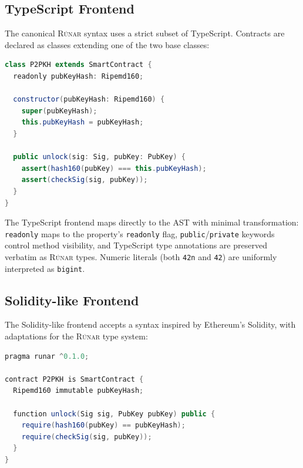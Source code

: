 \documentclass[11pt,a4paper]{article}
\newcommand{\runar}{\textsc{Rúnar}}
\newcommand{\bigintty}{\texttt{bigint}}
\begin{document}
\subsection{TypeScript Frontend}
\label{sec:frontend-ts}

The canonical \runar{} syntax uses a strict subset of TypeScript. Contracts
are declared as classes extending one of the two base classes:

\begin{lstlisting}[style=runar,language=Java,
  morekeywords={class,extends,constructor,super,readonly,public,private,const,let,if,else,for,return,assert,bigint,boolean}]
class P2PKH extends SmartContract {
  readonly pubKeyHash: Ripemd160;

  constructor(pubKeyHash: Ripemd160) {
    super(pubKeyHash);
    this.pubKeyHash = pubKeyHash;
  }

  public unlock(sig: Sig, pubKey: PubKey) {
    assert(hash160(pubKey) === this.pubKeyHash);
    assert(checkSig(sig, pubKey));
  }
}
\end{lstlisting}

The TypeScript frontend maps directly to the AST with minimal transformation:
\texttt{readonly} maps to the property's \texttt{readonly} flag,
\texttt{public}/\texttt{private} keywords control method visibility, and
TypeScript type annotations are preserved verbatim as \runar{} types.
Numeric literals (both \texttt{42n} and \texttt{42}) are uniformly
interpreted as \bigintty{}.

\subsection{Solidity-like Frontend}
\label{sec:frontend-sol}

The Solidity-like frontend accepts a syntax inspired by Ethereum's Solidity,
with adaptations for the \runar{} type system:

\begin{lstlisting}[style=runar,language=Java,
  morekeywords={pragma,contract,is,immutable,function,public,private,returns,require,int,bool,bytes}]
pragma runar ^0.1.0;

contract P2PKH is SmartContract {
  Ripemd160 immutable pubKeyHash;

  function unlock(Sig sig, PubKey pubKey) public {
    require(hash160(pubKey) == pubKeyHash);
    require(checkSig(sig, pubKey));
  }
}
\end{lstlisting}
\end{document}
